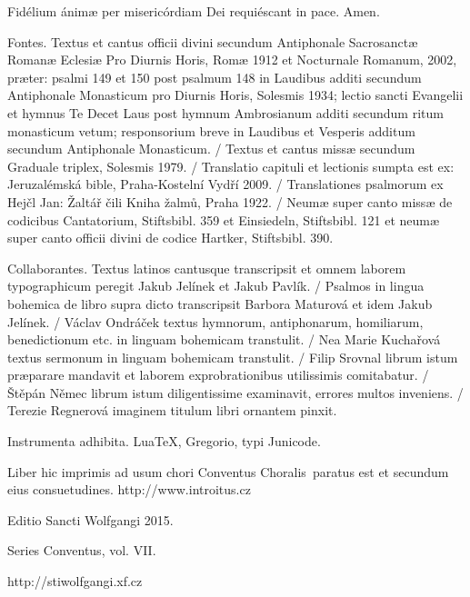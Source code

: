 \documentclass[a4paper, twoside, 12pt]{article}
\newcommand{\annusEditionis}{2015}
\begin{document}
\trOrationis

\vfill


\vfill

\noindent \Vbardot{} Fidélium ánimæ per misericórdiam Dei requiéscant in pace.
\Rbardot{} Amen.

\trFideliumAnimae

\vfill
\newpage
\RemoveSideThumbs
\pagestyle{empty}

\vfill

Fontes.
Textus et cantus officii divini secundum
Antiphonale Sacrosanctæ Romanæ Eclesiæ Pro Diurnis Horis, Romæ 1912
et Nocturnale Romanum, 2002, præter: psalmi 149 et 150 post
psalmum 148 in Laudibus additi secundum Antiphonale Monasticum pro Diurnis Horis,
Solesmis 1934; lectio sancti Evangelii et hymnus Te Decet Laus post hymnum
Ambrosianum additi secundum ritum monasticum vetum; responsorium breve
in Laudibus et Vesperis additum secundum Antiphonale Monasticum. /
Textus et cantus missæ secundum
Graduale triplex, Solesmis 1979. /
Translatio capituli et lectionis sumpta est ex:
Jeruzalémská bible, Praha-Kostelní Vydří 2009. /
Translationes psalmorum ex
Hejčl Jan: Žaltář čili Kniha žalmů, Praha 1922. /
Neumæ super canto missæ de codicibus Cantatorium, Stiftsbibl. 359 et Einsiedeln,
Stiftsbibl. 121 et neumæ super canto officii divini de codice Hartker,
Stiftsbibl. 390.

Collaborantes.
Textus latinos cantusque transcripsit et omnem laborem typographicum peregit
Jakub Jelínek et Jakub Pavlík. /
Psalmos in lingua bohemica de libro supra dicto transcripsit
Barbora Maturová et idem Jakub Jelínek. /
Václav Ondráček textus hymnorum, antiphonarum, homiliarum, benedictionum etc.
in linguam bohemicam transtulit. /
Nea Marie Kuchařová textus sermonum in linguam bohemicam transtulit. /
Filip Srovnal librum istum præparare mandavit et laborem exprobrationibus
utilissimis comitabatur. /
Štěpán Němec librum istum diligentissime examinavit, errores multos
inveniens. /
Terezie Regnerová imaginem titulum libri ornantem pinxit.

Instrumenta adhibita.
LuaTeX, %
Gregorio, %
typi Junicode. %

\begin{center}
Liber hic imprimis ad usum chori
\guillemotright Conventus Choralis\guillemotleft\
paratus est
et secundum eius consuetudines.
http://www.introitus.cz

\vfill

{\large Editio Sancti Wolfgangi \annusEditionis.}

\vfill

Series \guillemotright Conventus\guillemotleft, vol. VII.

\vfill

http://stiwolfgangi.xf.cz

\end{center}

\vfill
\end{document}
